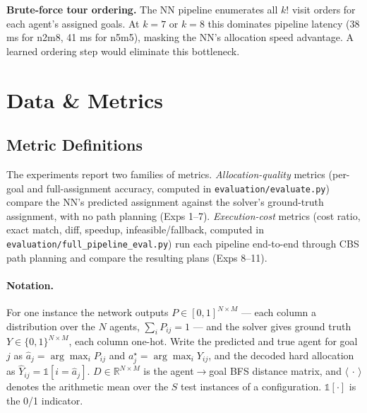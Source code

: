 \documentclass[11pt,a4paper]{article}
\begin{document}
\textbf{Brute-force tour ordering.} The NN pipeline enumerates all $k!$ visit orders for each
agent's assigned goals. At $k=7$ or $k=8$ this dominates pipeline latency (38 ms for n2m8,
41 ms for n5m5), masking the NN's allocation speed advantage. A learned ordering step would
eliminate this bottleneck.

\section{Data \& Metrics}

\subsection{Metric Definitions}

The experiments report two families of metrics. \emph{Allocation-quality} metrics (per-goal
and full-assignment accuracy, computed in \texttt{evaluation/evaluate.py}) compare the NN's
predicted assignment against the solver's ground-truth assignment, with no path planning
(Exps 1--7). \emph{Execution-cost} metrics (cost ratio, exact match, diff, speedup,
infeasible/fallback, computed in \texttt{evaluation/full\_pipeline\_eval.py}) run each pipeline
end-to-end through CBS path planning and compare the resulting plans (Exps 8--11).

\paragraph{Notation.} For one instance the network outputs $P\in[0,1]^{N\times M}$ --- each
column a distribution over the $N$ agents, $\sum_i P_{ij}=1$ --- and the solver gives ground
truth $Y\in\{0,1\}^{N\times M}$, each column one-hot. Write the predicted and true agent for
goal $j$ as $\hat a_j=\arg\max_i P_{ij}$ and $a^\star_j=\arg\max_i Y_{ij}$, and the decoded hard
allocation as $\hat Y_{ij}=\mathbb{1}[i=\hat a_j]$. $D\in\mathbb{R}^{N\times M}$ is the
agent$\to$goal BFS distance matrix, and $\langle\,\cdot\,\rangle$ denotes the arithmetic mean
over the $S$ test instances of a configuration. $\mathbb{1}[\cdot]$ is the 0/1 indicator.
\end{document}
